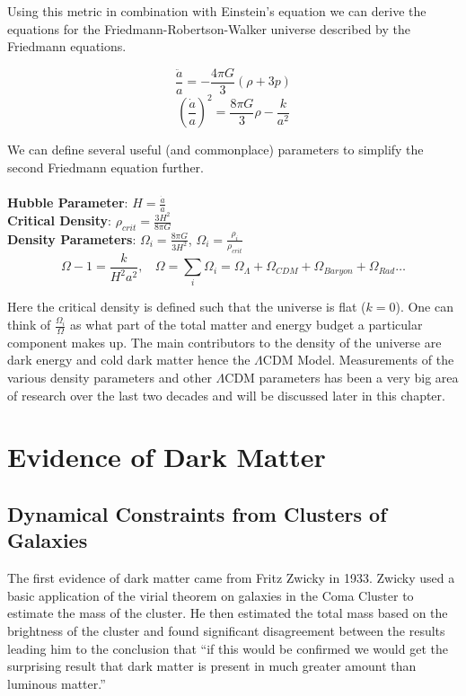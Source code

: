 	Using this metric in combination with Einstein's equation we can derive the equations for the Friedmann-Robertson-Walker universe described by the Friedmann equations.
	
	\begin{equation}
		\frac{\ddot{a}}{a} = -\frac{4 \pi G}{3} \left( \rho + 3p \right)
	\end{equation}
	\begin{equation}
		\left( \frac{\dot{a}}{a}\right)^{2} = \frac{8 \pi G}{3} \rho - \frac{k}{a^2}
	\end{equation}

	We can define several useful (and commonplace) parameters to simplify the second Friedmann equation further.
\\
\\
\textbf{Hubble Parameter}: $ H = \frac{\dot{a}}{a} $\\
\textbf{Critical Density}: $ \rho_{crit} = \frac{3H^2}{8 \pi G} $\\
\textbf{Density Parameters}: $ \Omega_{i} = \frac{8 \pi G}{3H^2}$,  $\Omega_{i} = \frac{\rho_{i}}{\rho_{crit}} $\\
\begin{equation}
	\Omega - 1 = \frac{k}{H^2 a^2}, \ \ \ \ \Omega = \sum_{i} \Omega_{i} = \Omega_{\Lambda} + \Omega_{CDM} + \Omega_{Baryon} + \Omega_{Rad}  \ldots 
\end{equation}
	
	Here the critical density is defined such that the universe is flat ($k=0$).  One can think of $\frac{\Omega_i}{\Omega}$ as what part of the total matter and energy budget a particular component makes up.  The main contributors to the density of the universe are dark energy and cold dark matter hence the $\Lambda$CDM Model.  Measurements of the various density parameters and other $\Lambda$CDM parameters has been a very big area of research over the last two decades and will be discussed later in this chapter.
	
\section{Evidence of Dark Matter}

\subsection{Dynamical Constraints from Clusters of Galaxies}

The first evidence of dark matter came from Fritz Zwicky in 1933.  Zwicky used a basic application of the virial theorem on galaxies in the Coma Cluster	to estimate the mass of the cluster.  He then  estimated the total mass based on the brightness of the cluster and found significant disagreement between the results leading him to the conclusion that ``if this would be confirmed we would get the surprising result that dark matter is present in much greater amount than luminous matter.'' \cite{Zwicky1933}
	

